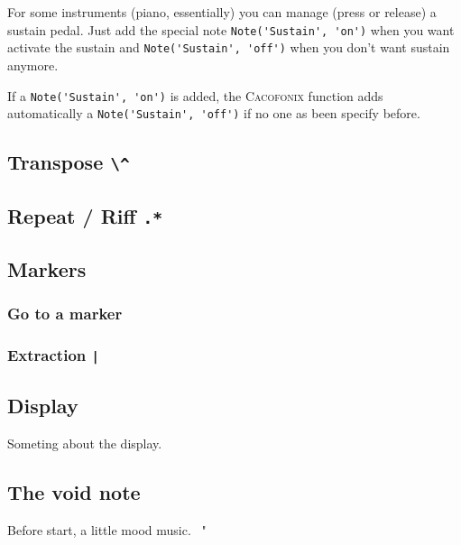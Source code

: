 \documentclass{article}
\newcommand\cacofonix{\textsc{Cacofonix}\xspace}
\newenvironment{meenv}{ \par \noindent \makebox[6em][r]{ \textcolor{mecolor}{Me}: " --~}}{~"}
\newcommand{ \me }[1]{%
\begin{meenv}%
	#1%
\end{meenv} }
\begin{document}
For some instruments (piano, essentially) you can manage (press or release) a sustain pedal. Just add the special note \lstinline!Note('Sustain', 'on')! when you want activate the sustain and \lstinline!Note('Sustain', 'off')! when you don't want sustain anymore.

If a \lstinline!Note('Sustain', 'on')! is added, the \cacofonix function adds automatically a \lstinline!Note('Sustain', 'off')! if no one as been specify before.


\subsection{Transpose \lstinline!\^!}
\label{sec:Transpose}

\subsection{Repeat / Riff \lstinline!.*!}
\label{sec:RepeatRiff}

\subsection{Markers}
\label{sec:Markers}

\subsubsection{Go to a marker}
\label{sec:Goto}

\subsubsection{Extraction \lstinline!|!}
\label{sec:Extraction}

\subsection{Display}
\label{sec:Display}

Someting about the display.

\subsection{The void note}
\label{sec:VoidNote}

\me{Before start, a little mood music.}

\vspace{ 0.25in }
\end{document}
